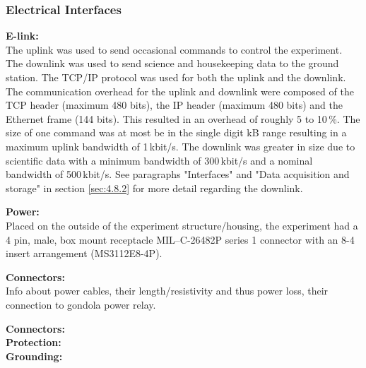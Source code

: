 \label{sec:4.2.2}


\subsubsection{Electrical Interfaces}
\label{sec:4.2.3}
\textbf{E-link:}\\
The uplink was used to send occasional commands to control the experiment. The downlink was used to send science and housekeeping data to the ground station. The TCP/IP protocol was used for both the uplink and the downlink. The communication overhead for the uplink and downlink were composed of the TCP header (maximum 480 bits), the IP header (maximum 480 bits) and the Ethernet frame (144 bits). This resulted in an overhead of roughly 5 to 10\,\%. The size of one command was at most be in the single digit kB range resulting in a maximum uplink bandwidth of 1\,kbit/s. The downlink was greater in size due to scientific data with a minimum bandwidth of 300\,kbit/s and a nominal bandwidth of 500\,kbit/s. See paragraphs "Interfaces" and "Data acquisition and storage" in section \ref{sec:4.8.2} for more detail regarding the downlink.

\textbf{Power:}\\

Placed on the outside of the experiment structure/housing, the experiment had a 4 pin, male, box mount receptacle MIL–C-26482P series 1 connector with an 8-4 insert arrangement (MS3112E8-4P).



\textbf{Connectors:}\\

%

Info about power cables, their length/resistivity and thus power loss, their connection to gondola power relay.



\textbf{Connectors:}\\

\textbf{Protection:}\\

\textbf{Grounding:}\\





\raggedbottom

